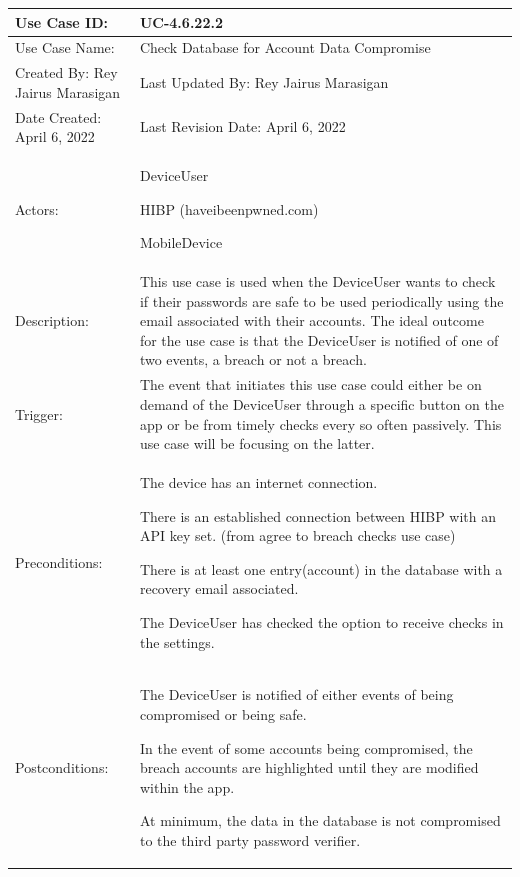 \documentclass[stu]{apa7}
\newcommand{\nextitem}{\par\hspace*{\labelsep}\textbullet\hspace*{\labelsep}}
\begin{document}
\scriptsize{\begin{xltabular}{\textwidth}{|l|X|}
  \hline Use Case ID: & UC-4.6.22.2 \\ \hline

  Use Case Name: & Check Database for Account Data Compromise \\ \hline

  Created By: Rey Jairus Marasigan & Last Updated By: Rey Jairus Marasigan \\ \hline

  Date Created: April 6, 2022 & Last Revision Date: April 6, 2022 \\ \hline

  Actors: & \nextitem DeviceUser \nextitem HIBP (haveibeenpwned.com) \nextitem MobileDevice \\ \hline

  Description: & This use case is used when the DeviceUser wants to check if their passwords are safe to be used periodically using the email associated with their accounts. The ideal outcome for the use case is that the DeviceUser is notified of one of two events, a breach or not a breach. \\ \hline

  Trigger: & The event that initiates this use case could either be on demand of the DeviceUser through a specific button on the app or be from timely checks every so often passively. This use case will be focusing on the latter. \\ \hline

  Preconditions: & \nextitem The device has an internet connection.
                   \nextitem There is an established connection between HIBP with an API key set. (from agree to breach checks use case)
                   \nextitem There is at least one entry(account) in the database with a recovery email associated.
                   \nextitem The DeviceUser has checked the option to receive checks in the settings. \\ \hline

  Postconditions: & \nextitem The DeviceUser is notified of either events of being compromised or being safe.
                    \nextitem In the event of some accounts being compromised, the breach accounts are highlighted until they are modified within the app.
                    \nextitem At minimum, the data in the database is not compromised to the third party password verifier. \\ \hline


\end{xltabular}}
\end{document}

